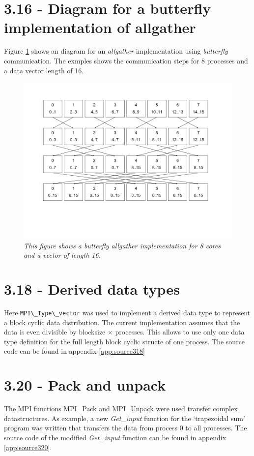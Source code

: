 \documentclass[a4paper,11pt,twoside]{article}
\begin{document}
\section{3.16 - Diagram for a butterfly implementation of allgather}
Figure \ref{fig:allgather} shows an diagram for an \textit{allgather} implementation using \textit{butterfly} communication. The exmples shows the communication steps for 8 processes and a data vector length of 16.  
\begin{figure}
  \centering
    \includegraphics[width=1\textwidth]{allgather.png}
    \caption{\textit{This figure shows a butterfly allgather implementation for 8 cores and a vector of length 16.}}
    \label{fig:allgather}
\end{figure}



\section{3.18 - Derived data types}
Here \verb+MPI\_Type\_vector+ was used to implement a derived data type to represent a block cyclic data distribution. The current implementation assumes that the data is even divisible by blocksize $\times$ processes. This allows to use only one data type definition for the full length block cyclic structe of one process. The source code can be found in appendix \ref{app:source318}

\section{3.20 - Pack and unpack}
The MPI functions MPI\_Pack and MPI\_Unpack were used transfer complex datastructures. As example, a new \textit{Get\_input} function for the `trapezoidal sum' program was written that transfers the data from process 0 to all processes. The source code of the modified \textit{Get\_input} function can be found in appendix \ref{app:source320}.
\end{document}
